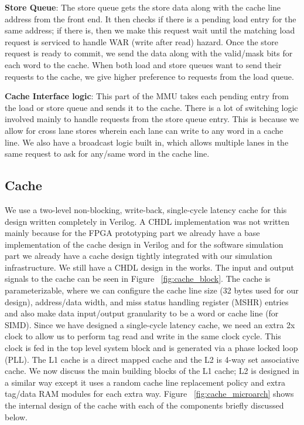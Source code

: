 \noindent\textbf{Store Queue}: The store queue gets the store data along with the cache line address from the front end. It then checks if there is a pending load entry for the same address; if there is, then we make this request wait until the matching load request is serviced to handle WAR (write after read) hazard. Once the store request is ready to commit, we send the data along with the valid/mask bits for each word to the cache. When both load and store queues want to send their requests to the cache, we give higher preference to requests from the load queue.

\noindent\textbf{Cache Interface logic}: This part of the MMU takes each pending entry from the load or store queue and sends it to the cache. There is a lot of switching logic involved mainly to handle requests from the store queue entry. This is because we allow for cross lane stores wherein each lane can write to any word in a cache line. 
We also have a broadcast logic built in, which allows multiple lanes in the same request to ask for any/same word in the cache line. 


\subsection{Cache}
We use a two-level non-blocking, write-back, single-cycle latency cache for this design written completely in Verilog. A CHDL implementation was not written mainly because for the FPGA prototyping part we already have a base implementation of the cache design in Verilog and for the software simulation part we already have a cache design tightly integrated with our simulation infrastructure. We still have a CHDL design in the works. 
The input and output signals to the cache can be seen in Figure ~\ref{fig:cache_block}. The cache is parameterizable, where we can configure the cache line size (32 bytes used for our design), address/data width, and miss status handling register (MSHR) entries and also make data input/output granularity to be a word or cache line (for SIMD). Since we have designed a single-cycle latency cache, we need an extra 2x clock to allow us to perform tag read and write in the same clock cycle. This clock is fed in the top level system block and is generated via a phase locked loop (PLL). The L1 cache is a direct mapped cache and the L2 is 4-way set associative cache. We now discuss the main building blocks of the L1 cache; L2 is designed in a similar way except it uses a random cache line replacement policy and extra tag/data RAM modules for each extra way. Figure ~\ref{fig:cache_microarch} shows the internal design of the cache with each of the components briefly discussed below.

